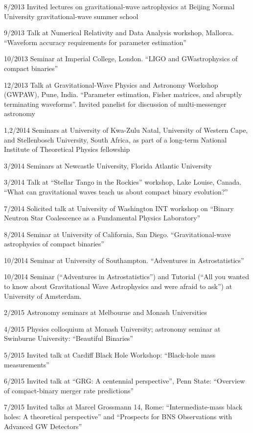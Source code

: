 \documentclass[margin,line]{res}
\begin{document}
\begin{resume}
8/2013	Invited lectures on gravitational-wave astrophysics at Beijing Normal University gravitational-wave summer school
 
9/2013 	Talk at Numerical Relativity and Data Analysis workshop, Mallorca. ``Waveform accuracy requirements for parameter estimation''

10/2013 	Seminar at Imperial College, London. ``LIGO and GWastrophysics of compact binaries''

12/2013   Talk at Gravitational-Wave Physics and Astronomy Workshop (GWPAW), Pune, India.  ``Parameter estimation, Fisher matrices, and abruptly terminating waveforms''.  Invited panelist for discussion of multi-messenger astronomy

1,2/2014	Seminars at University of Kwa-Zulu Natal, University of Western Cape, and Stellenbosch University, South Africa, as part of a long-term National Institute of Theoretical Physics fellowship

3/2014	Seminars at Newcastle University, Florida Atlantic University

3/2014	Talk at ``Stellar Tango in the Rockies'' workshop, Lake Louise, Canada.  ``What can gravitational waves teach us about compact binary evolution?''

7/2014	Solicited talk at University of Washington INT workshop on ``Binary Neutron Star Coalescence as a Fundamental Physics Laboratory''

8/2014 	Seminar at University of California, San Diego.   ``Gravitational-wave astrophysics of compact binaries''

10/2014	Seminar at University of Southampton.  ``Adventures in Astrostatistics''

10/2014	Seminar (``Adventures in Astrostatistics'') and Tutorial (``All you wanted to know about Gravitational Wave Astrophysics and were afraid to ask'') at University of Amsterdam.  

2/2015	Astronomy seminars at Melbourne and Monash Universities

4/2015 	Physics colloquium at Monash University; astronomy seminar at Swinburne University:  ``Beautiful Binaries''

5/2015	Invited talk at Cardiff Black Hole Workshop: ``Black-hole mass measurements''

6/2015	Invited talk at ``GRG: A centennial perspective'', Penn State: ``Overview of compact-binary merger rate predictions''

7/2015	Invited talks at Marcel Grossmann 14, Rome: ``Intermediate-mass black holes: A theoretical perspective'' and ``Prospects for BNS Observations with Advanced GW Detectors''


\end{resume}
\end{document}
